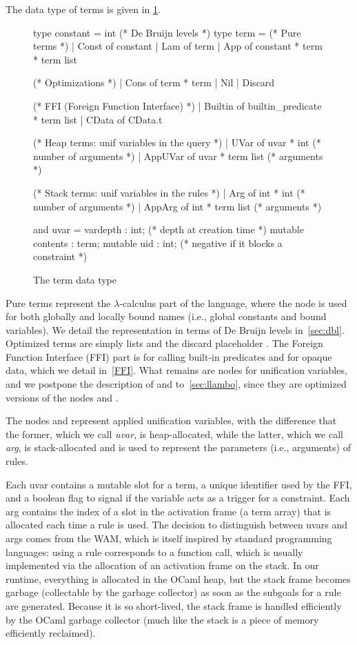 \documentclass{these-ISSS}
\newenvironment{ocamlcode}
  {\VerbatimEnvironment\begin{ocamlbox}\begin{xocamlcode}}{\end{xocamlcode}
\end{ocamlbox}}
\begin{document}
The data type of terms is given in \cref{fig:term}.
\begin{figure}
\begin{ocamlcode}
type constant = int (* De Bruijn levels *)
type term =
  (* Pure terms *)
  | Const of constant
  | Lam of term
  | App of constant * term * term list

  (* Optimizations *)
  | Cons of term * term
  | Nil
  | Discard

  (* FFI (Foreign Function Interface) *)
  | Builtin of builtin_predicate * term list
  | CData of CData.t

  (* Heap terms: unif variables in the query *)
  | UVar    of uvar * int (* number of arguments *)
  | AppUVar of uvar * term list (* arguments *)

  (* Stack terms: unif variables in the rules *)
  | Arg    of int * int (* number of arguments *)
  | AppArg of int * term list (* arguments *)

and uvar = {
  vardepth : int; (* depth at creation time *)
  mutable contents : term;
  mutable uid : int; (* negative if it blocks a constraint *)
}
\end{ocamlcode}
\caption{The term data type\label{fig:term}}
\end{figure}
Pure terms represent the $\lambda$-calculus part of the language, where the
 node is used for both globally and locally bound names (i.e.,
global constants and bound variables). We detail the representation in terms
of De Bruijn levels in~\cref{sec:dbl}. Optimized terms are simply lists and
the discard placeholder \elpi{_}. The Foreign Function Interface (FFI) part is for calling built-in
predicates and for opaque data, which we detail in~\cref{FFI}. What remains
are nodes for unification variables, and we postpone the description of
 and  to~\cref{sec:llambo}, since they are optimized
versions of the nodes  and .


The nodes  and  represent applied unification
variables, with the difference that the former, which we call \emph{uvar}, is
heap-allocated, while the latter, which we call \emph{arg}, is stack-allocated
and is used to represent the parameters (i.e., arguments) of rules.


Each uvar contains a mutable slot for a term, a unique identifier used by the
FFI, and a boolean flag to signal if the variable acts as a trigger for a
constraint. Each arg contains the index of a slot in the activation frame (a
term array) that is allocated each time a rule is used. The decision to
distinguish between uvars and args comes from the WAM, which is itself inspired by
standard programming languages: using a rule corresponds to a function call,
which is usually implemented via the allocation of an activation frame on the
stack. In our runtime, everything is allocated in the OCaml heap, but the
stack frame becomes garbage (collectable by the garbage collector) as soon as
the subgoals for a rule are generated. Because it is so short-lived, the stack
frame is handled efficiently by the OCaml garbage collector (much like the
stack is a piece of memory efficiently reclaimed).
\end{document}
